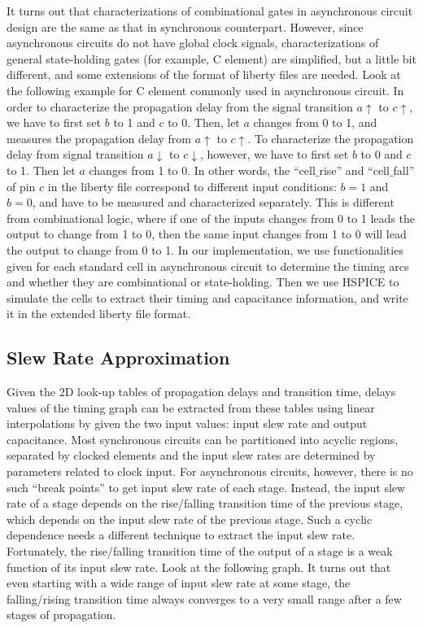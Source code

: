 \documentclass[sigconf, 10pt, twocolumn]{acmart}
\begin{document}
It turns out that characterizations of combinational gates in asynchronous circuit design are the same as that in synchronous counterpart. However, since asynchronous circuits do not have global clock signals, characterizations of general state-holding gates (for example, C element) are simplified, but a little bit different, and some extensions of the format of liberty files are needed. Look at the following example for C element commonly used in asynchronous circuit. In order to characterize the propagation delay from the signal transition $a\uparrow$ to $c\uparrow$, we have to first set $b$ to 1 and $c$ to 0. Then, let $a$ changes from 0 to 1, and measures the propagation delay from $a\uparrow$ to $c\uparrow$. To characterize the propagation delay from signal transition $a\downarrow$ to $c\downarrow$, however, we have to first set $b$ to 0 and $c$ to 1. Then let $a$ changes from 1 to 0. In other words, the ``cell$\_$rise'' and ``cell$\_$fall'' of pin $c$ in the liberty file correspond to different input conditions: $b = 1$ and $b = 0$, and have to be measured and characterized separately. This is different from combinational logic, where if one of the inputs changes from 0 to 1 leads the output to change from 1 to 0, then the same input changes from 1 to 0 will lead the output to change from 0 to 1.
In our implementation, we use functionalities given for each standard cell in asynchronous circuit to determine the timing arcs and whether they are combinational or state-holding. Then we use HSPICE to simulate the cells to extract their timing and capacitance information, and write it in the extended liberty file format.
\subsection{Slew Rate Approximation}
Given the 2D look-up tables of propagation delays and transition time, delays values of the timing graph can be extracted from these tables using linear interpolations by given the two input values: input slew rate and output capacitance. Most synchronous circuits can be partitioned into acyclic regions, separated by clocked elements and the input slew rates are determined by parameters related to clock input. For asynchronous circuits, however, there is no such ``break points'' to get input slew rate of each stage. Instead, the input slew rate of a stage depends on the rise/falling transition time of the previous stage, which depends on the input slew rate of the previous stage. Such a cyclic dependence needs a different technique to extract the input slew rate. Fortunately, the rise/falling transition time of the output of a stage is a weak function of its input slew rate. Look at the following graph. It turns out that even starting with a wide range of input slew rate at some stage, the falling/rising transition time always converges to a very small range after a few stages of propagation.
\end{document}
